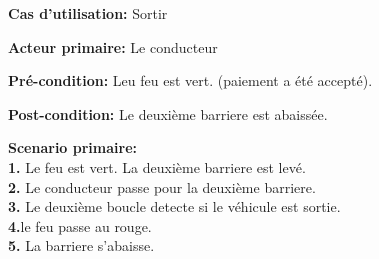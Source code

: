 \textbf{Cas d'utilisation:} Sortir

\textbf{Acteur primaire:}  Le conducteur


\textbf{Pré-condition:} Leu feu est vert. (paiement a été accepté).
 
\textbf{Post-condition:} Le deuxième barriere est abaissée. 

\textbf{Scenario primaire: } \\
    \textbf{1.} Le feu est vert. La deuxième barriere est levé. \\
    \textbf{2.} Le conducteur passe pour la deuxième barriere. \\
    \textbf{3.} Le deuxième boucle detecte si le véhicule est sortie.\\
    \textbf{4.}le feu passe au rouge.\\
    \textbf{5.} La barriere s'abaisse.\\

